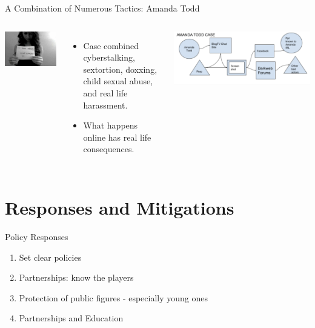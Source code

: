 \documentclass[nobackground,dvipsnames,table]{beamer}
\begin{document}
\begin{frame}{A Combination of Numerous Tactics: Amanda Todd}
    \begin{columns}
            \includegraphics[width=\textwidth]{i-have-nobody}
            \begin{itemize}
                \item Case combined cyberstalking, sextortion, doxxing, child sexual abuse, and real life harassment.
                \item What happens online has real life consequences.
            \end{itemize}
            \includegraphics[width=\textwidth]{amanda-todd-case}
    \end{columns}
\end{frame}

\section{Responses and Mitigations}

\begin{frame}{Policy Responses}
    \begin{enumerate}
        \item Set clear policies 
        \item Partnerships: know the players
        \item Protection of public figures - especially young ones
        \item Partnerships and Education
    \end{enumerate}
\end{frame}
\end{document}
